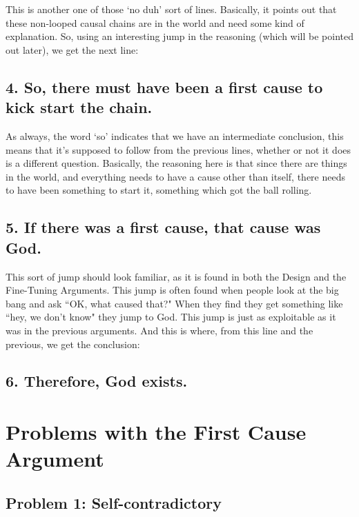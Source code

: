 This is another one of those `no duh' sort of lines. Basically, it points out that these non-looped causal chains are in the world and need some kind of explanation. So, using an interesting jump in the reasoning (which will be pointed out later), we get the next line:

\subsection{4. So, there must have been a first cause to kick start the chain.}

As always, the word `so' indicates that we have an intermediate conclusion, this means that it's supposed to follow from the previous lines, whether or not it does is a different question. Basically, the reasoning here is that since there are things in the world, and everything needs to have a cause other than itself, there needs to have been something to start it, something which got the ball rolling. 

\subsection{5. If there was a first cause, that cause was God.}

This sort of jump should look familiar, as it is found in both the Design and the Fine-Tuning Arguments. This jump is often found when people look at the big bang and ask ``OK, what caused that?" When they find they get something like ``hey, we don't know" they jump to God. This jump is just as exploitable as it was in the previous arguments. And this is where, from this line and the previous, we get the conclusion:

\subsection{6. Therefore, God exists.}

\section{Problems with the First Cause Argument}
\subsection{Problem 1: Self-contradictory}

